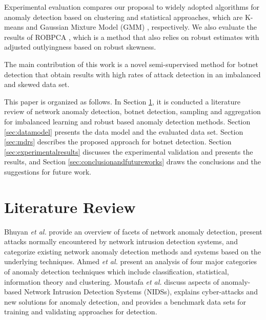 \documentclass[review]{elsarticle}
\begin{document}
Experimental evaluation compares our proposal to widely adopted algorithms for anomaly detection based on clustering and statistical approaches, which are K-means and Gaussian Mixture Model (GMM) \cite{gaddam2007kmeans,moustafa2019holistic}, respectively. We also evaluate the results of ROBPCA \cite{hubert2005robpca}, which is a method that also relies on robust estimates with adjusted outlyingness based on robust skewness.

The main contribution of this work is a novel semi-supervised method for botnet detection that obtain results with high rates of attack detection in an imbalanced and skewed data set.

This paper is organized as follows. In Section \ref{sec:review}, it is conducted a literature review of network anomaly detection, botnet detection, sampling and aggregation for imbalanced learning and robust based anomaly detection methods. Section \ref{sec:datamodel} presents the data model and the evaluated data set. Section \ref{sec:mdrs} describes the proposed approach for botnet detection. Section \ref{sec:experimentalresults} discusses the experimental validation and presents the results, and Section \ref{sec:conclusionandfutureworks} draws the conclusions and the suggestions for future work.

\section{Literature Review}
\label{sec:review}

Bhuyan \emph{et al.} \cite{bhuyan2014network} provide an overview of facets of network anomaly detection, present attacks normally encountered by network intrusion detection systems, and categorize existing network anomaly detection methods and systems based on the underlying techniques. Ahmed \emph{et al.} \cite{ahmed2016survey} present an analysis of four major categories of anomaly detection techniques which include classification, statistical, information theory and clustering. Moustafa \emph{et al.} \cite{moustafa2019holistic} discuss aspects of anomaly-based Network Intrusion Detection Systems (NIDSs), explains cyber-attacks and new solutions for anomaly detection, and provides a benchmark data sets for training and validating approaches for detection. 
\end{document}
